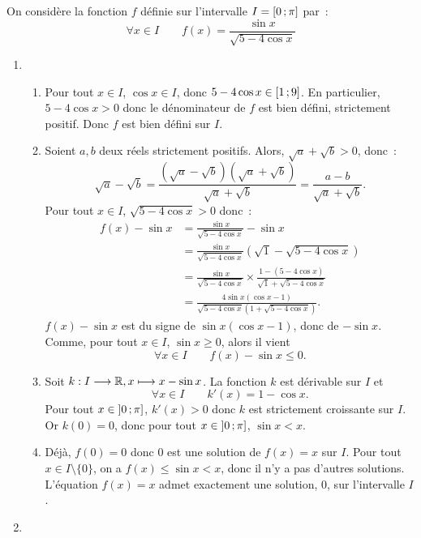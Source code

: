 \begin{corrige}[Problème]
    On considère la fonction \(f\) définie sur l'intervalle \(I = \left[ 0 \, ;  \pi \right]\) par~:
    \begin{equation*}
        \forall x \in I \qquad f(x) = \frac{\sin x}{\sqrt{5-4\cos x}}
    \end{equation*}
    \begin{enumerate}
        \item
            \begin{enumerate}
                \item Pour tout \(x \in I\), \(\cos x \in I\), donc \(5-4\cos x \in \left[ 1 \, ;  9 \right]\). En particulier, \(5-4\cos x >0\) donc le dénominateur de \(f\) est bien défini, strictement positif. Donc \(f\) est bien défini sur \(I\).
                \item Soient \(a, b\) deux réels strictement positifs. Alors, \(\sqrt{a}+\sqrt{b} >0\), donc~:
                    \begin{equation*}
                        \sqrt{a}-\sqrt{b} = \frac{(\sqrt{a}-\sqrt{b})(\sqrt{a}+\sqrt{b})}{\sqrt{a}+\sqrt{b}} = \frac{a-b}{\sqrt{a}+\sqrt{b}}.
                    \end{equation*}
                Pour tout \(x \in I\), \(\sqrt{5-4\cos x}>0\) donc~:
                \begin{align*}
                    f(x)-\sin x &=\frac{\sin x}{\sqrt{5-4\cos x}} - \sin x \\
                                &=\frac{\sin x}{\sqrt{5-4\cos x}}(\sqrt{1}- \sqrt{5-4\cos x}) \\
                                &=\frac{\sin x}{\sqrt{5-4\cos x}} \times \frac{1-(5-4\cos x)}{\sqrt{1}+\sqrt{5-4\cos x}} \\
                                &=\frac{4\sin x (\cos x -1)}{\sqrt{5-4\cos x}(1+\sqrt{5-4\cos x})}.
                \end{align*}
                \(f(x)-\sin x\) est du signe de \(\sin x (\cos x -1)\), donc de \(-\sin x\). Comme, pour tout \(x \in I\), \(\sin x \geq 0\), alors il vient
                \begin{equation*}
                    \forall x \in I \qquad f(x)-\sin x \leq 0.
                \end{equation*}
            \item Soit \(k:I \longrightarrow \mathbb{R}, x \longmapsto x-\sin x\). La fonction \(k\) est dérivable sur \(I\) et \[\forall x \in I \qquad k'(x) = 1-\cos x.\]
                Pour tout \(x \in \left] 0 \, ;  \pi \right]\), \(k'(x)>0\) donc \(k\) est strictement croissante sur \(I\). Or \(k(0)=0\), donc pour tout \(x \in \left] 0 \, ;  \pi \right]\), \(\sin x < x\).
            \item Déjà, \(f(0)=0\) donc \(0\) est une solution de \(f(x)=x\) sur \(I\). Pour tout \(x \in I\setminus\{0\}\), on a \(f(x) \leq \sin x < x\), donc il n'y a pas d'autres solutions. L'équation \(f(x)=x\) admet exactement une solution, \(0\), sur l'intervalle \(I\).
            \end{enumerate}
        \item 
    \end{enumerate}    
\end{corrige}
